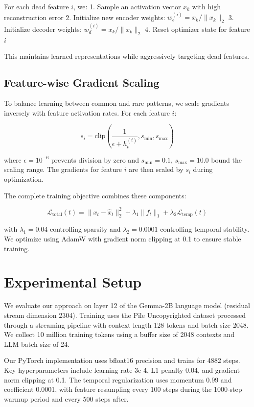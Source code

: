 \documentclass{article} %
\begin{document}
For each dead feature $i$, we:
1. Sample an activation vector $x_k$ with high reconstruction error
2. Initialize new encoder weights: $w_e^{(i)} = x_k/\|x_k\|_2$
3. Initialize decoder weights: $w_d^{(i)} = x_k/\|x_k\|_2$
4. Reset optimizer state for feature $i$

This maintains learned representations while aggressively targeting dead features.

\subsection{Feature-wise Gradient Scaling}
To balance learning between common and rare patterns, we scale gradients inversely with feature activation rates. For each feature $i$:

\begin{equation}
    s_i = \text{clip}\left(\frac{1}{\epsilon + h_t^{(i)}}, s_{\text{min}}, s_{\text{max}}\right)
\end{equation}

where $\epsilon=10^{-6}$ prevents division by zero and $s_{\text{min}}=0.1$, $s_{\text{max}}=10.0$ bound the scaling range. The gradients for feature $i$ are then scaled by $s_i$ during optimization.

The complete training objective combines these components:

\begin{equation}
    \mathcal{L}_{\text{total}}(t) = \|x_t - \hat{x}_t\|_2^2 + \lambda_1\|f_t\|_1 + \lambda_2\mathcal{L}_{\text{temp}}(t)
\end{equation}

with $\lambda_1=0.04$ controlling sparsity and $\lambda_2=0.0001$ controlling temporal stability. We optimize using AdamW with gradient norm clipping at 0.1 to ensure stable training.

\section{Experimental Setup}
\label{sec:experimental}

We evaluate our approach on layer 12 of the Gemma-2B language model (residual stream dimension 2304). Training uses the Pile Uncopyrighted dataset processed through a streaming pipeline with context length 128 tokens and batch size 2048. We collect 10 million training tokens using a buffer size of 2048 contexts and LLM batch size of 24.

Our PyTorch implementation uses bfloat16 precision and trains for 4882 steps. Key hyperparameters include learning rate 3e-4, L1 penalty 0.04, and gradient norm clipping at 0.1. The temporal regularization uses momentum 0.99 and coefficient 0.0001, with feature resampling every 100 steps during the 1000-step warmup period and every 500 steps after.
\end{document}
